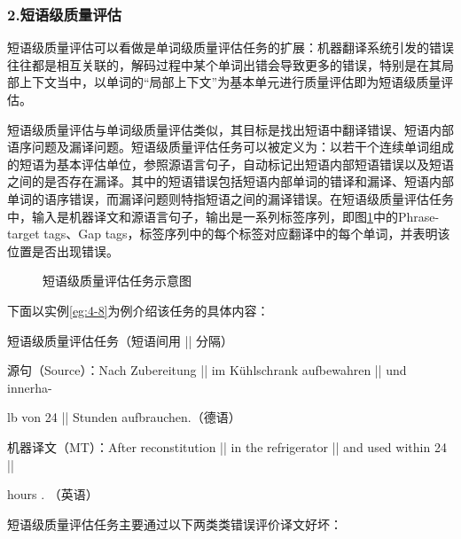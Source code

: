 \subsubsection{2.短语级质量评估}

\parinterval 短语级质量评估可以看做是单词级质量评估任务的扩展：机器翻译系统引发的错误往往都是相互关联的，解码过程中某个单词出错会导致更多的错误，特别是在其局部上下文当中，以单词的“局部上下文”为基本单元进行质量评估即为短语级质量评估。

\parinterval 短语级质量评估与单词级质量评估类似，其目标是找出短语中翻译错误、短语内部语序问题及漏译问题。短语级质量评估任务可以被定义为：以若干个连续单词组成的短语为基本评估单位，参照源语言句子，自动标记出短语内部短语错误以及短语之间的是否存在漏译。其中的短语错误包括短语内部单词的错译和漏译、短语内部单词的语序错误，而漏译问题则特指短语之间的漏译错误。在短语级质量评估任务中，输入是机器译文和源语言句子，输出是一系列标签序列，即图\ref{fig:4-12}中的Phrase-target tags、Gap tags，标签序列中的每个标签对应翻译中的每个单词，并表明该位置是否出现错误。

\begin{figure}[htp]
    \centering
	
   \caption{短语级质量评估任务示意图}
   \label{fig:4-12}
\end{figure}

\parinterval 下面以实例\ref{eg:4-8}为例介绍该任务的具体内容：

\begin{example}
短语级质量评估任务（短语间用 || 分隔）

源句（Source）：Nach Zubereitung || im Kühlschrank aufbewahren || und innerha-

\hspace{7.3em}lb von 24 || Stunden aufbrauchen.（德语）

机器译文（MT）：After reconstitution || in the refrigerator || and used within 24 ||

 \hspace{8em}hours . （英语）
\label{eg:4-8}
\end{example}

\parinterval 短语级质量评估任务主要通过以下两类类错误评价译文好坏：

